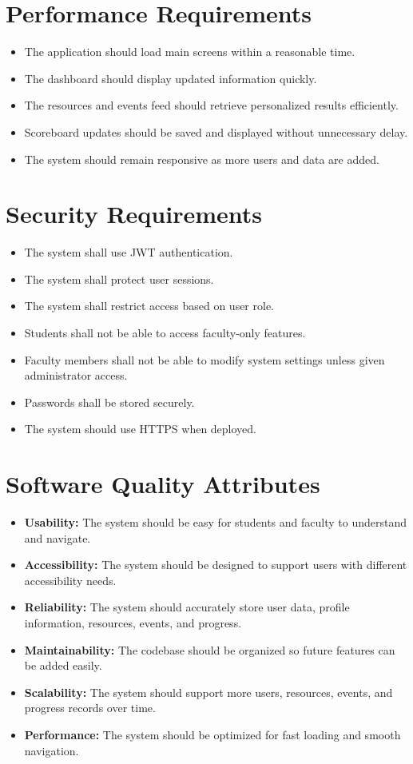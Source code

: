 \documentclass{scrreprt}
\begin{document}
\section{Performance Requirements}
\begin{itemize}
    \item The application should load main screens within a reasonable time.
    \item The dashboard should display updated information quickly.
    \item The resources and events feed should retrieve personalized results efficiently.
    \item Scoreboard updates should be saved and displayed without unnecessary delay.
    \item The system should remain responsive as more users and data are added.
\end{itemize}

\section{Security Requirements}
\begin{itemize}
    \item The system shall use JWT authentication.
    \item The system shall protect user sessions.
    \item The system shall restrict access based on user role.
    \item Students shall not be able to access faculty-only features.
    \item Faculty members shall not be able to modify system settings unless given administrator access.
    \item Passwords shall be stored securely.
    \item The system should use HTTPS when deployed.
\end{itemize}

\section{Software Quality Attributes}
\begin{itemize}
    \item \textbf{Usability:} The system should be easy for students and faculty to understand and navigate.
    \item \textbf{Accessibility:} The system should be designed to support users with different accessibility needs.
    \item \textbf{Reliability:} The system should accurately store user data, profile information, resources, events, and progress.
    \item \textbf{Maintainability:} The codebase should be organized so future features can be added easily.
    \item \textbf{Scalability:} The system should support more users, resources, events, and progress records over time.
    \item \textbf{Performance:} The system should be optimized for fast loading and smooth navigation.
\end{itemize}
\end{document}
